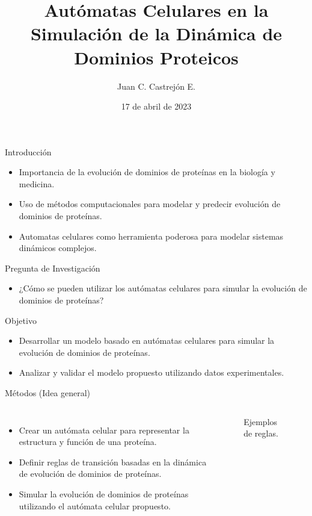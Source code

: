 \documentclass{beamer}
\title[A.C. en la Simulación de la Dinámica de Dominios Proteicos]{Autómatas Celulares en la Simulación de la Dinámica de Dominios Proteicos}
\author[Universidad Nacional Autónoma de México]{Juan C. Castrejón E.}
\institute{Universidad Nacional Autónoma de México}
\date{17 de abril de 2023}
\begin{document}
\begin{frame}
\titlepage
\end{frame}

\begin{frame}{Introducción}
\begin{itemize}
\item Importancia de la evolución de dominios de proteínas en la biología y medicina.
\item Uso de métodos computacionales para modelar y predecir evolución de dominios de proteínas.
\item Automatas celulares como herramienta poderosa para modelar sistemas dinámicos complejos.
\end{itemize}
\end{frame}

\begin{frame}{Pregunta de Investigación}
\begin{itemize}
\item ¿Cómo se pueden utilizar los autómatas celulares para simular la evolución de dominios de proteínas?
\end{itemize}
\end{frame}

\begin{frame}{Objetivo}
\begin{itemize}
\item Desarrollar un modelo basado en autómatas celulares para simular la evolución de dominios de proteínas.
\item Analizar y validar el modelo propuesto utilizando datos experimentales.
\end{itemize}
\end{frame}

\begin{frame}{Métodos (Idea general)}
\begin{columns}
\begin{itemize}
\item Crear un autómata celular para representar la estructura y función de una proteína.
\item Definir reglas de transición basadas en la dinámica de evolución de dominios de proteínas.
\item Simular la evolución de dominios de proteínas utilizando el autómata celular propuesto.
\end{itemize}
\begin{figure}[ht]
\centering

\caption{Ejemplos de reglas.}
\label{fig:direct_svg}
\end{figure}
\end{columns}
\end{frame}
\end{document}
